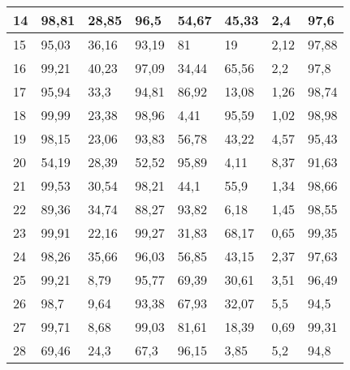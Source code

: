 \begin{longtable}[c]{|l|l|l|l|l|l|l|l|}
14              & 98,81        & 28,85        & 96,5        & 54,67         & 45,33         & 2,4           & 97,6          \\ \hline
15              & 95,03        & 36,16        & 93,19       & 81            & 19            & 2,12          & 97,88         \\ \hline
16              & 99,21        & 40,23        & 97,09       & 34,44         & 65,56         & 2,2           & 97,8          \\ \hline
17              & 95,94        & 33,3         & 94,81       & 86,92         & 13,08         & 1,26          & 98,74         \\ \hline
18              & 99,99        & 23,38        & 98,96       & 4,41          & 95,59         & 1,02          & 98,98         \\ \hline
19              & 98,15        & 23,06        & 93,83       & 56,78         & 43,22         & 4,57          & 95,43         \\ \hline
20              & 54,19        & 28,39        & 52,52       & 95,89         & 4,11          & 8,37          & 91,63         \\ \hline
21              & 99,53        & 30,54        & 98,21       & 44,1          & 55,9          & 1,34          & 98,66         \\ \hline
22              & 89,36        & 34,74        & 88,27       & 93,82         & 6,18          & 1,45          & 98,55         \\ \hline
23              & 99,91        & 22,16        & 99,27       & 31,83         & 68,17         & 0,65          & 99,35         \\ \hline
24              & 98,26        & 35,66        & 96,03       & 56,85         & 43,15         & 2,37          & 97,63         \\ \hline
25              & 99,21        & 8,79         & 95,77       & 69,39         & 30,61         & 3,51          & 96,49         \\ \hline
26              & 98,7         & 9,64         & 93,38       & 67,93         & 32,07         & 5,5           & 94,5          \\ \hline
27              & 99,71        & 8,68         & 99,03       & 81,61         & 18,39         & 0,69          & 99,31         \\ \hline
28              & 69,46        & 24,3         & 67,3        & 96,15         & 3,85          & 5,2           & 94,8          \\ \hline

\end{longtable}
